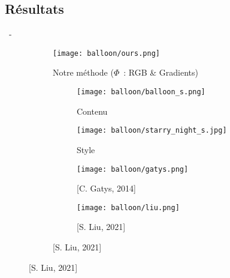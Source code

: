 \documentclass[aspectratio=169, 22pt]{beamer}
\begin{document}
\subsection{Résultats}
\begin{frame}{\secname~- \subsecname}
  \begin{figure}
    \begin{subfigure}{0.47\linewidth}
      \texttt{[image: balloon/ours.png]}
      \caption{Notre méthode ($\Phi$ : RGB \& Gradients)}
    \end{subfigure}
    \begin{subfigure}{0.45\linewidth}
      \begin{subfigure}{0.45\linewidth}
        \texttt{[image: balloon/balloon\_s.png]}
        \caption{Contenu}
      \end{subfigure}
      \begin{subfigure}{0.45\linewidth}
        \texttt{[image: balloon/starry\_night\_s.jpg]}
        \caption{Style}
      \end{subfigure}

      \begin{subfigure}{0.45\linewidth}
        \texttt{[image: balloon/gatys.png]}
        \caption{[C. Gatys, 2014]}
      \end{subfigure}
      \begin{subfigure}{0.45\linewidth}
        \texttt{[image: balloon/liu.png]}
        \caption{[S. Liu, 2021]}
      \end{subfigure}
    \end{subfigure}
  \end{figure}
\end{frame}
\end{document}

